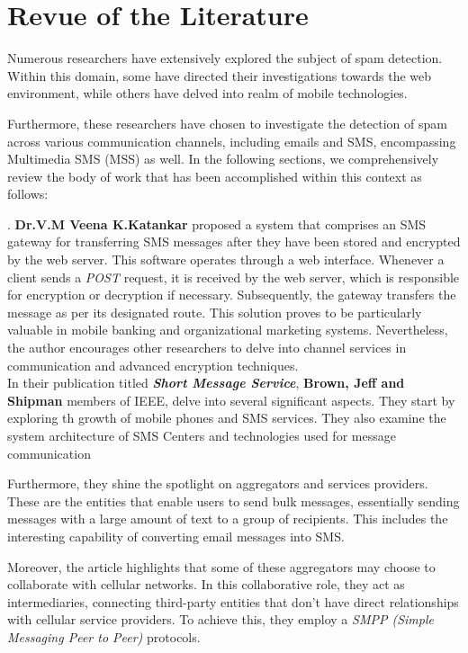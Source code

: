 \documentclass[12pt,a4paper]{report}
\begin{document}
    \section{Revue of the Literature}  
    Numerous researchers have extensively explored the subject of spam detection. Within this domain, some have directed their investigations towards the web environment, while others have delved into realm of mobile	technologies.
    
    Furthermore, these researchers have chosen to investigate the detection of spam across various communication channels, including emails and SMS, encompassing Multimedia SMS (MSS) as well. In the following sections, we comprehensively review the body of work that has been accomplished within this context as follows:
     
	\cite{katankar2010short}. \textbf{Dr.V.M Veena K.Katankar}
	proposed a system that comprises an SMS gateway for transferring SMS messages after they have been stored and encrypted by the web server. This software operates through a web interface. Whenever a client sends a \textit{POST} request, it is received by the web server, which is responsible for encryption or decryption if necessary. Subsequently, the gateway transfers the message as per its designated route. This solution proves to be particularly valuable in mobile banking and organizational marketing systems. Nevertheless, the author encourages other researchers to delve into channel services in communication and advanced encryption techniques.\\
		
	\cite{brown2007sms} In their publication titled \textbf{\textit{Short Message Service}}, \textbf{Brown, Jeff and Shipman} members of IEEE, delve into several significant aspects. They start by exploring th growth of mobile phones and SMS services. They also examine the system architecture of SMS Centers and technologies used for message communication
	
	Furthermore, they shine the spotlight on aggregators and services providers. These are the entities that enable users to send bulk messages, essentially sending messages with a large amount of text to a group of recipients. This includes the interesting capability of converting email messages into SMS.
	
	Moreover, the article highlights that some of these aggregators may choose to collaborate with cellular networks. In this collaborative role, they act as intermediaries, connecting third-party entities that don't have direct relationships with cellular service providers. To achieve this, they employ a \textit{SMPP (Simple Messaging Peer to Peer)} protocols.\\
	
\end{document}
